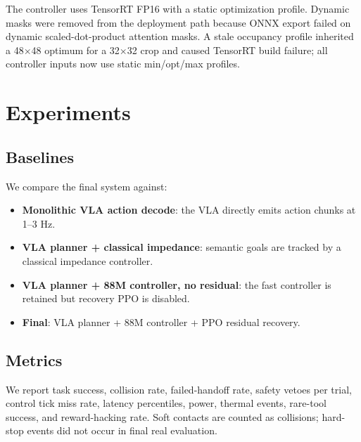 \documentclass[10pt,twocolumn]{article}
\begin{document}
The controller uses TensorRT FP16 with a static optimization profile. Dynamic masks were removed from the deployment path because ONNX export failed on dynamic scaled-dot-product attention masks. A stale occupancy profile inherited a 48$\times$48 optimum for a 32$\times$32 crop and caused TensorRT build failure; all controller inputs now use static min/opt/max profiles.

\section{Experiments}

\subsection{Baselines}

We compare the final system against:
\begin{itemize}[leftmargin=1.3em,itemsep=0.15em]
  \item \textbf{Monolithic VLA action decode}: the VLA directly emits action chunks at 1--3 Hz.
  \item \textbf{VLA planner + classical impedance}: semantic goals are tracked by a classical impedance controller.
  \item \textbf{VLA planner + 88M controller, no residual}: the fast controller is retained but recovery PPO is disabled.
  \item \textbf{Final}: VLA planner + 88M controller + PPO residual recovery.
\end{itemize}

\subsection{Metrics}

We report task success, collision rate, failed-handoff rate, safety vetoes per trial, control tick miss rate, latency percentiles, power, thermal events, rare-tool success, and reward-hacking rate. Soft contacts are counted as collisions; hard-stop events did not occur in final real evaluation.
\end{document}
